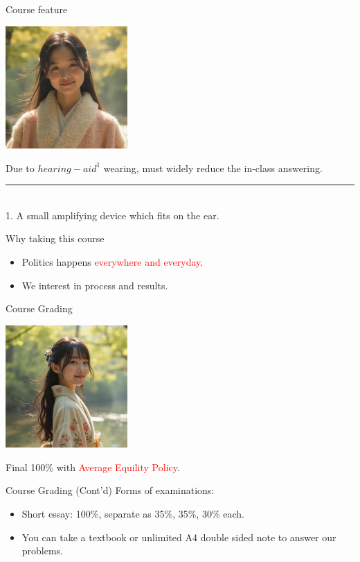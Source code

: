 \documentclass{beamer}
\begin{document}
\begin{frame}{Course feature}
\begin{center}
\includegraphics[width=0.35\textwidth]{feature.png}
\end{center}
\begin{center}
Due to $hearing-aid^{1}$ wearing, must widely reduce the in-class answering.
\end{center}
\vspace{1em}
\rule{0.35\textwidth}{0.5pt} \\
\scriptsize 1. A small amplifying device which fits on the ear.
\end{frame}
\begin{frame}{Why taking this course}
\begin{itemize}
\item Politics happens \textcolor{red}{everywhere and everyday}.
\item We interest in process and results.
\end{itemize}
\end{frame}
\begin{frame}{Course Grading}
\begin{center}
\includegraphics[width=0.35\textwidth]{examination.png}
\end{center}
\begin{center}
Final 100\% with \textcolor{red}{Average Equility Policy}.
\end{center}
\end{frame}
\begin{frame}{Course Grading (Cont'd)}
Forms of examinations:
\begin{itemize}
\item Short essay: 100\%, separate as 35\%, 35\%, 30\% each.
\item You can take a textbook or unlimited A4 double sided note to answer our problems.
\end{itemize}
\end{frame}
\end{document}
